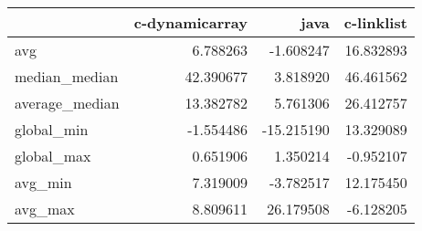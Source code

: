 \begin{tabular}{lrrr}
\toprule
{} &  c-dynamicarray &       java &  c-linklist \\
\midrule
avg            &        6.788263 &  -1.608247 &   16.832893 \\
median\_median  &       42.390677 &   3.818920 &   46.461562 \\
average\_median &       13.382782 &   5.761306 &   26.412757 \\
global\_min     &       -1.554486 & -15.215190 &   13.329089 \\
global\_max     &        0.651906 &   1.350214 &   -0.952107 \\
avg\_min        &        7.319009 &  -3.782517 &   12.175450 \\
avg\_max        &        8.809611 &  26.179508 &   -6.128205 \\
\bottomrule
\end{tabular}
